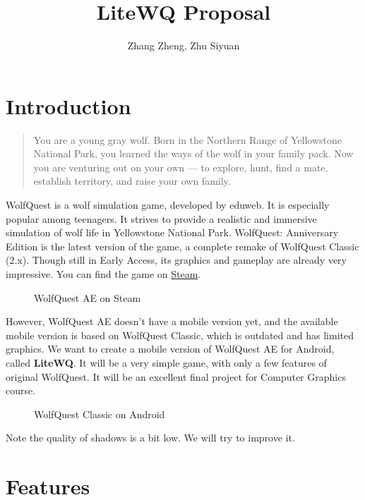 \documentclass[a4paper]{article}
\title{LiteWQ Proposal}
\author{Zhang Zheng, Zhu Siyuan}
\newcommand{\includegraphicx}[1]{\maxsizebox{\textwidth}{\textheight}{\texttt{[image: \#1]}}}
\begin{document}
\maketitle

\hypertarget{introduction}{%
\section{Introduction}\label{introduction}}

\begin{quote}
You are a young gray wolf. Born in the Northern Range of Yellowstone
National Park, you learned the ways of the wolf in your family pack. Now
you are venturing out on your own --- to explore, hunt, find a mate,
establish territory, and raise your own family.
\end{quote}

WolfQuest is a wolf simulation game, developed by eduweb. It is
especially popular among teenagers. It strives to provide a realistic
and immersive simulation of wolf life in Yellowstone National Park.
WolfQuest: Anniversary Edition is the latest version of the game, a
complete remake of WolfQuest Classic (2.x). Though still in Early
Access, its graphics and gameplay are already very impressive. You can
find the game on
\href{https://store.steampowered.com/app/926990/WolfQuest_Anniversary_Edition/}{Steam}.

\begin{figure}[H]
\centering
\includegraphicx{img/wqae_steam.png}
\caption{WolfQuest AE on Steam}
\end{figure}

However, WolfQuest AE doesn't have a mobile version yet, and the
available mobile version is based on WolfQuest Classic, which is
outdated and has limited graphics. We want to create a mobile version of
WolfQuest AE for Android, called \textbf{LiteWQ}. It will be a very
simple game, with only a few features of original WolfQuest. It will be
an excellent final project for Computer Graphics course.

\begin{figure}[H]
\centering
\includegraphicx{img/mobile.jpg}
\caption{WolfQuest Classic on Android}
\end{figure}

Note the quality of shadows is a bit low. We will try to improve it.

\hypertarget{features}{%
\section{Features}\label{features}}
\end{document}
